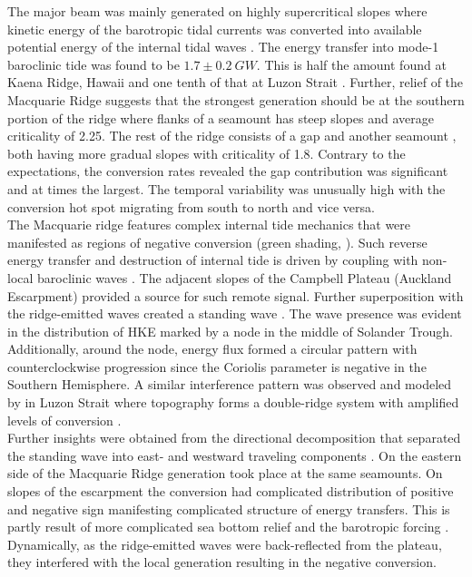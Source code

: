 \documentclass[12pt]{article}
\begin{document}
The major beam was mainly generated on highly supercritical slopes where kinetic energy of the 
barotropic tidal currents was converted into available potential energy of the internal tidal 
waves . The energy transfer into mode-1 baroclinic tide was found to be $1.7 
\pm 0.2~GW$. 
This is half the amount found at Kaena Ridge, Hawaii \citep{carter2008energetics} and one tenth of 
that at Luzon Strait \citep{alford2011energy, kerry2014impact}. Further, relief of 
the Macquarie Ridge suggests that the strongest generation should be at the southern portion of the 
ridge where flanks of a seamount has steep slopes and average criticality of 2.25. The rest of the 
ridge consists of a gap and another seamount , both 
having more gradual slopes with criticality of 1.8. Contrary to the expectations, 
the conversion rates  revealed the gap contribution was significant and 
at times the largest. The temporal variability was unusually high with the conversion hot spot 
migrating from south to north and vice versa.\\

The Macquarie ridge features complex internal tide mechanics that were manifested as 
regions of negative conversion (green shading, ). Such reverse energy 
transfer and destruction of internal tide is driven by coupling with non-local baroclinic waves 
\citep{Kelly2010a}. The adjacent slopes of the Campbell Plateau (Auckland Escarpment) provided 
a source for such remote signal. Further superposition with the 
ridge-emitted waves created a standing wave . The wave presence was 
evident in the distribution of HKE marked by a node in the middle of Solander Trough. Additionally, 
around the node, energy flux formed a circular pattern  with 
counterclockwise progression since the Coriolis parameter is negative in the Southern Hemisphere. 
A similar interference pattern was observed and modeled by \cite{buijsman2014three} in Luzon 
Strait where topography forms a double-ridge system with amplified levels of conversion 
\citep{buijsman2012double, klymak2013parameterizing}.\\

Further insights were obtained from the directional decomposition that separated the 
standing wave into east- and westward traveling components . On 
the eastern side of the Macquarie Ridge generation took 
place at the same seamounts. On slopes of the escarpment the conversion had complicated  
distribution of positive and negative sign manifesting complicated structure of energy transfers. 
This is partly result of more complicated sea bottom relief and the barotropic forcing 
. Dynamically, as the ridge-emitted waves were 
back-reflected from the plateau, they interfered with the local generation 
resulting in the 
negative conversion.\\
\end{document}
